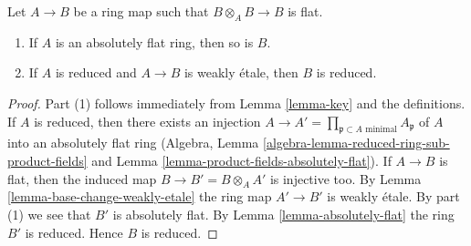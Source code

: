 \begin{lemma}
\label{lemma-absolutely-flat-over-absolutely-flat}
Let $A \to B$ be a ring map such that $B \otimes_A B \to B$ is flat.
\begin{enumerate}
\item If $A$ is an absolutely flat ring, then so is $B$.
\item If $A$ is reduced and $A \to B$ is weakly \'etale, then $B$ is reduced.
\end{enumerate}
\end{lemma}

\begin{proof}
Part (1) follows immediately from Lemma \ref{lemma-key} and the definitions.
If $A$ is reduced, then there exists an injection
$A \to A' = \prod_{\mathfrak p \subset A\text{ minimal}} A_\mathfrak p$
of $A$ into an absolutely flat ring
(Algebra, Lemma \ref{algebra-lemma-reduced-ring-sub-product-fields} and
Lemma \ref{lemma-product-fields-absolutely-flat}).
If $A \to B$ is flat, then the induced map $B \to B' = B \otimes_A A'$
is injective too. By Lemma \ref{lemma-base-change-weakly-etale}
the ring map $A' \to B'$ is weakly \'etale.
By part (1) we see that $B'$ is absolutely flat.
By Lemma \ref{lemma-absolutely-flat} the ring $B'$ is reduced.
Hence $B$ is reduced.
\end{proof}
